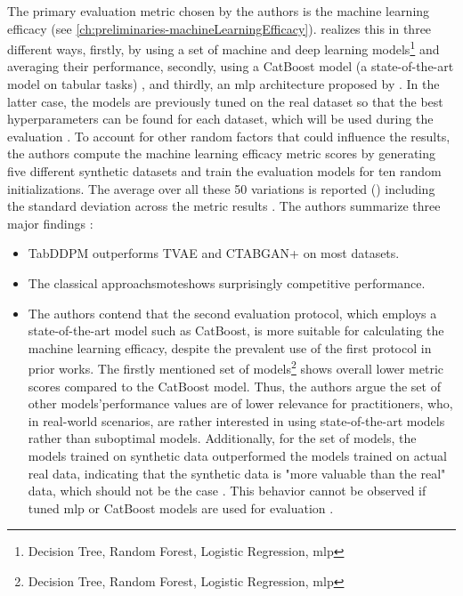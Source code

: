 The primary evaluation metric chosen by the authors is the machine learning efficacy (see \autoref{ch:preliminaries-machineLearningEfficacy}).
\textcite{kotelnikov2022TabDDPMModellingTabular} realizes this in three different ways, firstly, by using a set of machine and deep learning models\footnote[5]{Decision Tree, Random Forest, Logistic Regression, \gls{mlp}} and averaging their performance,
secondly, using a CatBoost model \cite{prokhorenkova2018CatBoostUnbiasedBoosting}(a state-of-the-art model on tabular tasks) \cite{kotelnikov2022TabDDPMModellingTabular}, and thirdly, an \gls{mlp} architecture proposed by \cite{gorishniy2021RevisitingDeepLearning}.
In the latter case, the models are previously tuned on the real dataset so that the best hyperparameters can be found for each dataset, which will be used during the evaluation \cite{kotelnikov2022TabDDPMModellingTabular}.
To account for other random factors that could influence the results, the authors compute the machine learning efficacy metric scores by generating five different synthetic datasets and train the evaluation models for ten random initializations.
The average over all these 50 variations is reported (\cite[Table 3, 4, p. 8]{kotelnikov2022TabDDPMModellingTabular}) including the standard deviation across the metric results \cite{kotelnikov2022TabDDPMModellingTabular}.
The authors summarize three major findings \cite{kotelnikov2022TabDDPMModellingTabular}:
\begin{itemize}
    \item TabDDPM outperforms TVAE and CTABGAN+ on most datasets.
    \item The classical approach\gls{smote}shows surprisingly competitive performance.
    \item The authors contend that the second evaluation protocol, which employs a state-of-the-art model such as CatBoost, is more suitable for calculating the machine learning efficacy, 
    despite the prevalent use of the first protocol in prior works. 
    The firstly mentioned set of models\footnote[5]{Decision Tree, Random Forest, Logistic Regression, \gls{mlp}} shows overall lower metric scores compared to the CatBoost model.
    Thus, the authors argue the set of other models'\footnotemark[5] performance values are of lower relevance for practitioners, who, in real-world scenarios, are rather interested in using state-of-the-art models rather than suboptimal models.
    Additionally, for the set of models, the models trained on synthetic data outperformed the models trained on actual real data, indicating that the 
    synthetic data is "more valuable than the real" data, which should not be the case \cite[p. 8]{kotelnikov2022TabDDPMModellingTabular}.
    This behavior cannot be observed if tuned \gls{mlp} or CatBoost models are used for evaluation \cite{kotelnikov2022TabDDPMModellingTabular}.
\end{itemize}

